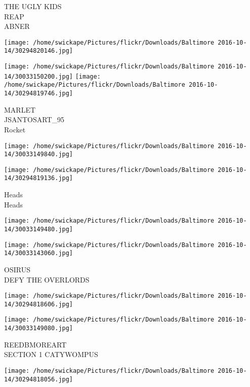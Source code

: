 \documentclass[10pt,letterpaper]{article}
\begin{document}
THE UGLY KIDS\\
REAP\\
ABNER\\
\pagebreak

\texttt{[image: /home/swickape/Pictures/flickr/Downloads/Baltimore 2016-10-14/30294820146.jpg]}

\vspace{0.25in}
\texttt{[image: /home/swickape/Pictures/flickr/Downloads/Baltimore 2016-10-14/30033150200.jpg]}
\texttt{[image: /home/swickape/Pictures/flickr/Downloads/Baltimore 2016-10-14/30294819746.jpg]}

MARLET\\
JSANTOSART\_95\\
Rocket\\
\pagebreak

\texttt{[image: /home/swickape/Pictures/flickr/Downloads/Baltimore 2016-10-14/30033149840.jpg]}

\vspace{0.25in}
\texttt{[image: /home/swickape/Pictures/flickr/Downloads/Baltimore 2016-10-14/30294819136.jpg]}

Heads\\
Heads\\
\pagebreak

\texttt{[image: /home/swickape/Pictures/flickr/Downloads/Baltimore 2016-10-14/30033149480.jpg]}

\vspace{0.25in}
\texttt{[image: /home/swickape/Pictures/flickr/Downloads/Baltimore 2016-10-14/30033143060.jpg]}

OSIRUS\\
DEFY THE OVERLORDS\\
\pagebreak

\texttt{[image: /home/swickape/Pictures/flickr/Downloads/Baltimore 2016-10-14/30294818606.jpg]}

\vspace{0.25in}
\texttt{[image: /home/swickape/Pictures/flickr/Downloads/Baltimore 2016-10-14/30033149080.jpg]}

REEDBMOREART\\
SECTION 1 CATYWOMPUS\\
\pagebreak

\texttt{[image: /home/swickape/Pictures/flickr/Downloads/Baltimore 2016-10-14/30294818056.jpg]}
\end{document}
